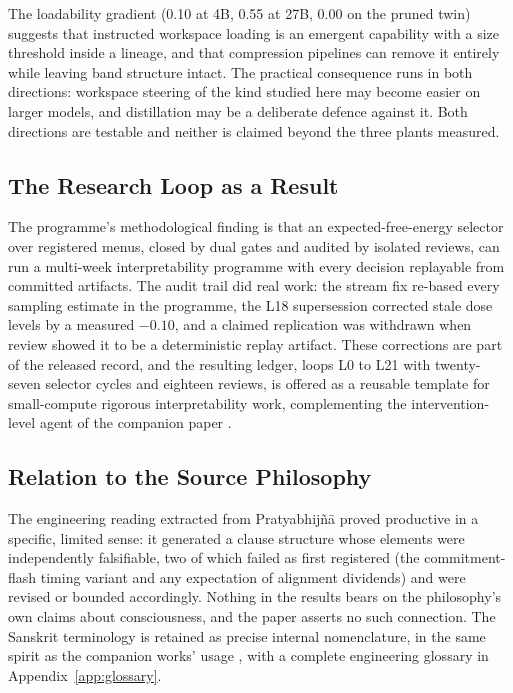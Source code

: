 The loadability gradient (0.10 at 4B, 0.55 at 27B, 0.00 on the pruned twin) suggests that instructed workspace loading is an emergent capability with a size threshold inside a lineage, and that compression pipelines can remove it entirely while leaving band structure intact. The practical consequence runs in both directions: workspace steering of the kind studied here may become easier on larger models, and distillation may be a deliberate defence against it. Both directions are testable and neither is claimed beyond the three plants measured.

\subsection{The Research Loop as a Result}

The programme's methodological finding is that an expected-free-energy selector over registered menus, closed by dual gates and audited by isolated reviews, can run a multi-week interpretability programme with every decision replayable from committed artifacts. The audit trail did real work: the stream fix re-based every sampling estimate in the programme, the L18 supersession corrected stale dose levels by a measured $-0.10$, and a claimed replication was withdrawn when review showed it to be a deterministic replay artifact. These corrections are part of the released record, and the resulting ledger, loops L0 to L21 with twenty-seven selector cycles and eighteen reviews, is offered as a reusable template for small-compute rigorous interpretability work, complementing the intervention-level agent of the companion paper \cite{Sathish2026ACD}.

\subsection{Relation to the Source Philosophy}

The engineering reading extracted from Pratyabhij\~n\=a proved productive in a specific, limited sense: it generated a clause structure whose elements were independently falsifiable, two of which failed as first registered (the commitment-flash timing variant and any expectation of alignment dividends) and were revised or bounded accordingly. Nothing in the results bears on the philosophy's own claims about consciousness, and the paper asserts no such connection. The Sanskrit terminology is retained as precise internal nomenclature, in the same spirit as the companion works' usage \cite{Sathish2026ACD,Sathish2026Refusal}, with a complete engineering glossary in Appendix~\ref{app:glossary}.

